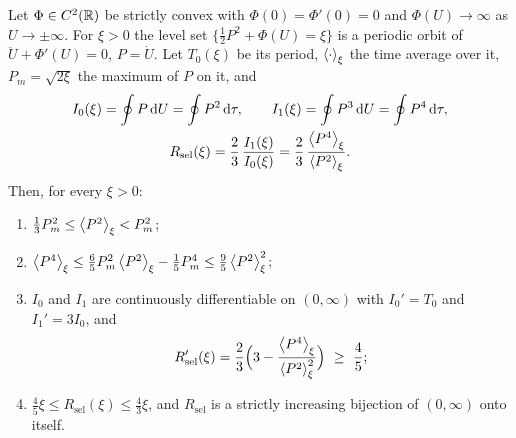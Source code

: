 \begin{theorem}\label{thm:kurtosis}
Let $\Phi\in C^2(\mathbb R)$ be strictly convex with $\Phi(0)=\Phi'(0)=0$ and $\Phi(U)\to\infty$ as $U\to\pm\infty$. For $\xi>0$ the level set $\{\tfrac12P^2+\Phi(U)=\xi\}$ is a periodic orbit of $\ddot U+\Phi'(U)=0$, $P=\dot U$. Let $T_0(\xi)$ be its period, $\left\langle \cdot\right\rangle_\xi$ the time average over it, $P_m=\sqrt{2\xi}$ the maximum of $P$ on it, and
\begin{equation}\label{wed:eq:actions}
\begin{gathered}
I_0(\xi)=\oint P\,\mathrm dU=\oint P^2\,\mathrm d\tau,\qquad
I_1(\xi)=\oint P^3\,\mathrm dU=\oint P^4\,\mathrm d\tau,\\
R_{\mathrm{sel}}(\xi)=\frac23\,\frac{I_1(\xi)}{I_0(\xi)}=\frac23\,\frac{\left\langle P^4\right\rangle_\xi}{\left\langle P^2\right\rangle_\xi}.
\end{gathered}
\end{equation}
Then, for every $\xi>0$:
\begin{enumerate}[label=\textup{(\roman*)}]
\item $\tfrac13P_m^2\le\left\langle P^2\right\rangle_\xi<P_m^2$;
\item $\left\langle P^4\right\rangle_\xi\le\tfrac65P_m^2\left\langle P^2\right\rangle_\xi-\tfrac15P_m^4\le\tfrac95\left\langle P^2\right\rangle_\xi^2$;
\item $I_0$ and $I_1$ are continuously differentiable on $(0,\infty)$ with $I_0'=T_0$ and $I_1'=3I_0$, and
\[
R_{\mathrm{sel}}'(\xi)=\frac23\Bigl(3-\frac{\avg{P^4}_\xi}{\avg{P^2}_\xi^2}\Bigr)\ \ge\ \frac45;
\]
\item $\tfrac45\xi\le R_{\mathrm{sel}}(\xi)\le\tfrac43\xi$, and $R_{\mathrm{sel}}$ is a strictly increasing bijection of $(0,\infty)$ onto itself.
\end{enumerate}
\end{theorem}
